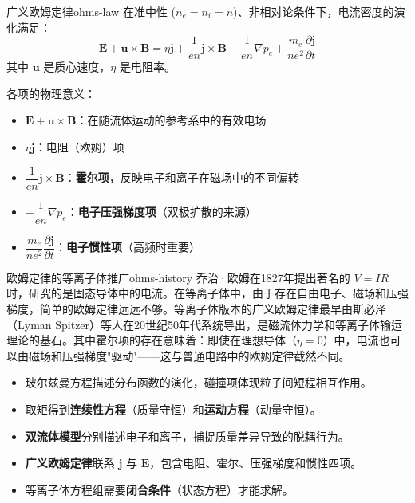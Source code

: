 \documentclass[12pt,a4paper,openany,oneside]{book}
\newcommand{\vect}[1]{\bm{#1}}
\newcommand{\grad}{\nabla}
\begin{document}
\begin{theorem}{广义欧姆定律}{ohms-law}
在准中性 ($n_e = n_i = n$)、非相对论条件下，电流密度的演化满足：
\[
\vect{E} + \vect{u}\times\vect{B} = \eta\vect{j} + \frac{1}{en}\vect{j}\times\vect{B} - \frac{1}{en}\grad p_e + \frac{m_e}{n e^2}\frac{\partial\vect{j}}{\partial t}
\]
其中 $\vect{u}$ 是质心速度，$\eta$ 是电阻率。

各项的物理意义：
\begin{itemize}
\item $\vect{E} + \vect{u}\times\vect{B}$：在随流体运动的参考系中的有效电场
\item $\eta\vect{j}$：电阻（欧姆）项
\item $\dfrac{1}{en}\vect{j}\times\vect{B}$：\textbf{霍尔项}，反映电子和离子在磁场中的不同偏转
\item $-\dfrac{1}{en}\grad p_e$：\textbf{电子压强梯度项}（双极扩散的来源）
\item $\dfrac{m_e}{ne^2}\dfrac{\partial\vect{j}}{\partial t}$：\textbf{电子惯性项}（高频时重要）
\end{itemize}
\end{theorem}

\begin{history}{欧姆定律的等离子体推广}{ohms-history}
乔治·欧姆在1827年提出著名的 $V=IR$ 时，研究的是固态导体中的电流。在等离子体中，由于存在自由电子、磁场和压强梯度，简单的欧姆定律远远不够。等离子体版本的广义欧姆定律最早由斯必泽（Lyman Spitzer）等人在20世纪50年代系统导出，是磁流体力学和等离子体输运理论的基石。其中霍尔项的存在意味着：即使在理想导体（$\eta=0$）中，电流也可以由磁场和压强梯度"驱动"——这与普通电路中的欧姆定律截然不同。
\end{history}

\begin{chapterreview}
\begin{itemize}
\item 玻尔兹曼方程描述分布函数的演化，碰撞项体现粒子间短程相互作用。
\item 取矩得到\textbf{连续性方程}（质量守恒）和\textbf{运动方程}（动量守恒）。
\item \textbf{双流体模型}分别描述电子和离子，捕捉质量差异导致的脱耦行为。
\item \textbf{广义欧姆定律}联系 $\vect{j}$ 与 $\vect{E}$，包含电阻、霍尔、压强梯度和惯性四项。
\item 等离子体方程组需要\textbf{闭合条件}（状态方程）才能求解。
\end{itemize}
\end{chapterreview}
\end{document}
